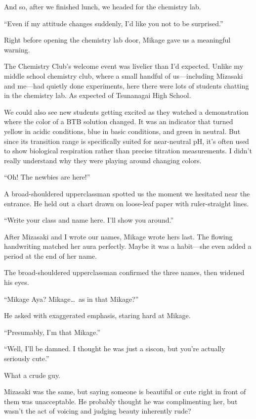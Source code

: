 \documentclass[
    a4paper,
    12pt,
    twoside,
    openany,
    UTF8,
    fontset=windows
]{ctexbook}
\begin{document}
And so, after we finished lunch, we headed for the chemistry lab.

``Even if my attitude changes suddenly, I'd like you not to be surprised.''

Right before opening the chemistry lab door, Mikage gave us a meaningful warning.

The Chemistry Club's welcome event was livelier than I'd expected. Unlike my middle school chemistry club, where a small handful of us---including Mizasaki and me---had quietly done experiments, here there were lots of students chatting in the chemistry lab. As expected of Tsunanagai High School.

We could also see new students getting excited as they watched a demonstration where the color of a BTB solution changed. It was an indicator that turned yellow in acidic conditions, blue in basic conditions, and green in neutral. But since its transition range is specifically suited for near-neutral pH, it's often used to show biological respiration rather than precise titration measurements. I didn't really understand why they were playing around changing colors.

``Oh! The newbies are here!''

A broad-shouldered upperclassman spotted us the moment we hesitated near the entrance. He held out a chart drawn on loose-leaf paper with ruler-straight lines.

``Write your class and name here. I'll show you around.''

After Mizasaki and I wrote our names, Mikage wrote hers last. The flowing handwriting matched her aura perfectly. Maybe it was a habit---she even added a period at the end of her name.

The broad-shouldered upperclassman confirmed the three names, then widened his eyes.

``Mikage Aya? Mikage\dots\ as in that Mikage?''

He asked with exaggerated emphasis, staring hard at Mikage.

``Presumably, I'm that Mikage.''

``Well, I'll be damned. I thought he was just a siscon, but you're actually seriously cute.''

What a crude guy.

Mizasaki was the same, but saying someone is beautiful or cute right in front of them was unacceptable. He probably thought he was complimenting her, but wasn't the act of voicing and judging beauty inherently rude?
\end{document}
